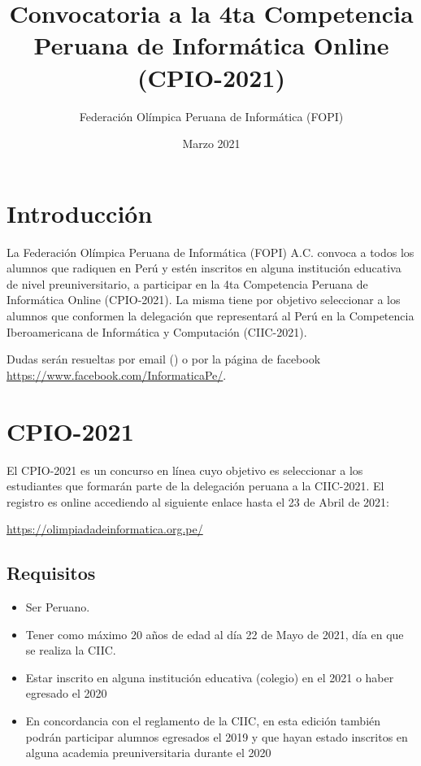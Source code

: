 \documentclass{article}
\title{Convocatoria a la 4ta Competencia Peruana de Informática Online (CPIO-2021)
}
\author{Federación Olímpica Peruana de Informática (FOPI)}
\date{Marzo 2021}
\begin{document}
\maketitle

\section{Introducción}

La Federación Olímpica Peruana de Informática (FOPI) A.C. convoca a todos los alumnos que radiquen en Perú y estén inscritos en alguna institución educativa de nivel preuniversitario, a participar en la 4ta Competencia Peruana de Informática Online (CPIO-2021). La misma tiene por objetivo seleccionar a los alumnos que conformen la delegación que representará al Perú en la Competencia Iberoamericana de Informática y Computación (CIIC-2021).

Dudas serán resueltas por email 
({\color{blue}{olimpiadaperuanainformatica@gmail.com})}
o por la página de facebook \url{https://www.facebook.com/InformaticaPe/}.



\section{CPIO-2021}

El CPIO-2021 es un concurso en línea cuyo objetivo
es seleccionar a los estudiantes que formarán parte de la delegación peruana a la CIIC-2021.
El registro es online accediendo al siguiente enlace
{\color{red} hasta el 23 de Abril de 2021}:

\begin{center}
\url{https://olimpiadadeinformatica.org.pe/}
\end{center}

\subsection{Requisitos}

\begin{itemize}
    \item Ser Peruano.
    \item Tener como máximo 20 años de edad al día 22 de Mayo de 2021, día en que se realiza la CIIC.
    \item Estar inscrito en alguna institución educativa (colegio) en el 2021 o haber egresado el 2020 
    \item En concordancia con el reglamento de la CIIC, en esta edición también podrán participar alumnos egresados el 2019 y que hayan estado inscritos en alguna academia preuniversitaria durante el 2020
\end{itemize}
\end{document}
